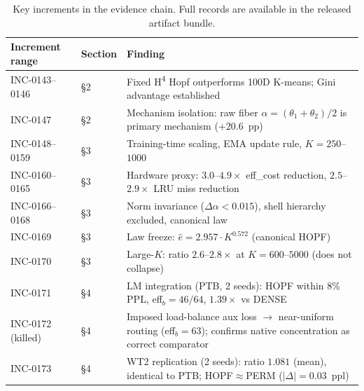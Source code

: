 \documentclass[11pt]{article}
\begin{document}
\begin{table}[h]
\centering
\caption{Key increments in the evidence chain. Full records are available in the released artifact bundle.}
\label{tab:evidence}
\small
\begin{tabular}{p{2.9cm}p{1.5cm}p{8.8cm}}
\toprule
Increment range     & Section & Finding \\
\midrule
INC-0143--0146      & \S2     & Fixed H\textsuperscript{4} Hopf outperforms 100D K-means;
                               Gini advantage established \\
INC-0147            & \S2     & Mechanism isolation: raw fiber $\alpha=(\theta_1+\theta_2)/2$
                               is primary mechanism (+20.6~pp) \\
INC-0148--0159      & \S3     & Training-time scaling, EMA update rule, $K{=}250$--$1000$ \\
INC-0160--0165      & \S3     & Hardware proxy: $3.0$--$4.9\times$ eff\_cost reduction,
                               $2.5$--$2.9\times$ LRU miss reduction \\
INC-0166--0168      & \S3     & Norm invariance ($\Delta\alpha < 0.015$), shell hierarchy
                               excluded, canonical law \\
INC-0169            & \S3     & Law freeze: $\hat{e} = 2.957 \cdot K^{0.572}$ (canonical HOPF) \\
INC-0170            & \S3     & Large-$K$: ratio $2.6$--$2.8\times$ at $K{=}600$--$5000$
                               (does not collapse) \\
INC-0171            & \S4     & LM integration (PTB, 2 seeds): HOPF within 8\% PPL,
                               eff$_b{=}46/64$, $1.39\times$ vs DENSE \\
INC-0172 (killed)   & \S4     & Imposed load-balance aux loss $\to$ near-uniform routing
                               (eff$_b{=}63$); confirms native concentration
                               as correct comparator \\
INC-0173            & \S4     & WT2 replication (2 seeds): ratio $1.081$ (mean),
                               identical to PTB; HOPF${\approx}$PERM ($|\Delta|{=}0.03$~ppl) \\
\bottomrule
\end{tabular}
\end{table}
\end{document}
